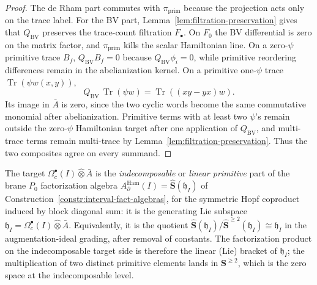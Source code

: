 \begin{proof}
  The de Rham part commutes with \(\pi_{\mathrm{prim}}\) because the
  projection acts only on the trace label.  For the BV part,
  Lemma~\ref{lem:filtration-preservation} gives that \(Q_{\mathrm{BV}}\)
  preserves the trace-count filtration \(F_\bullet\).  On \(F_0\) the BV
  differential is zero on the matrix factor, and \(\pi_{\mathrm{prim}}\)
  kills the scalar Hamiltonian line.  On a zero-\(\psi\) primitive trace
  \(B_f\), \(Q_{\mathrm{BV}}B_f=0\) because \(Q_{\mathrm{BV}}\phi_i=0\),
  while primitive reordering differences remain in the abelianization
  kernel.  On a primitive one-\(\psi\) trace
  \(\operatorname{Tr}(\psi w(x,y))\),
  \[
    Q_{\mathrm{BV}}\,\operatorname{Tr}(\psi w)
      =\operatorname{Tr}((xy-yx)w).
  \]
  Its image in \(\bar A\) is zero, since the two cyclic words become the
  same commutative monomial after abelianization.  Primitive terms with
  at least two \(\psi\)'s remain outside the zero-\(\psi\) Hamiltonian
  target after one application of \(Q_{\mathrm{BV}}\), and multi-trace
  terms remain multi-trace by Lemma~\ref{lem:filtration-preservation}.
  Thus the two composites agree on every summand.
\end{proof}

\begin{rmk}
  \label{rmk:primitive-target-indecomposable}
  The target
  $\Omega^\bullet_c(I)\widehat\otimes\bar A$ is the
  \emph{indecomposable} or \emph{linear primitive} part of the brane
  $P_0$ factorization algebra
  $A_\partial^{\mathrm{Ham}}(I)=\widehat{\mathbf S}(\mathfrak h_I)$
  of Construction~\ref{constr:interval-fact-algebras}, for the
  symmetric Hopf coproduct induced by block diagonal sum: it is
  the generating Lie subspace
  $\mathfrak h_I=\Omega^\bullet_c(I)\widehat\otimes\bar A$.  Equivalently,
  it is the quotient
  $\widehat{\mathbf S}(\mathfrak h_I)/\widehat{\mathbf S}^{\geq 2}(\mathfrak h_I)
  \cong\mathfrak h_I$ in the augmentation-ideal grading, after
  removal of constants.  The factorization product on the indecomposable
  target side is therefore the linear (Lie) bracket of $\mathfrak h_I$;
  the multiplication of two
  distinct primitive elements lands in $\mathbf S^{\geq 2}$, which is
  the zero space at the indecomposable level.
\end{rmk}

